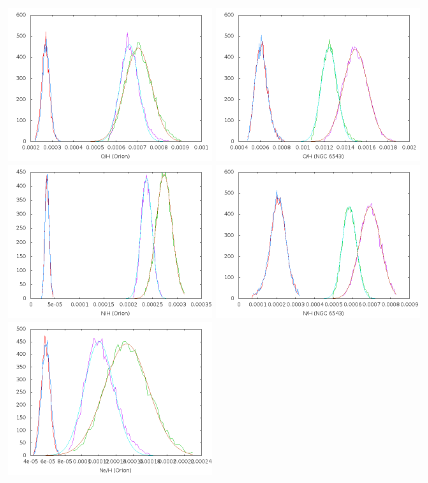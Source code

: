 \documentclass[useAMS,usenatbib]{mn2e}
\begin{document}
\begin{figure}
\includegraphics[width=0.48\textwidth]{figures/orion_O_rpeffect.png}
\includegraphics[width=0.48\textwidth]{figures/ngc6543_o_rpeffect.png}
\includegraphics[width=0.48\textwidth]{figures/orion_N_rpeffect.png}
\includegraphics[width=0.48\textwidth]{figures/ngc6543_n_rpeffect.png}
\includegraphics[width=0.48\textwidth]{figures/orion_Ne_rpeffect.png}

\end{figure}
\end{document}

